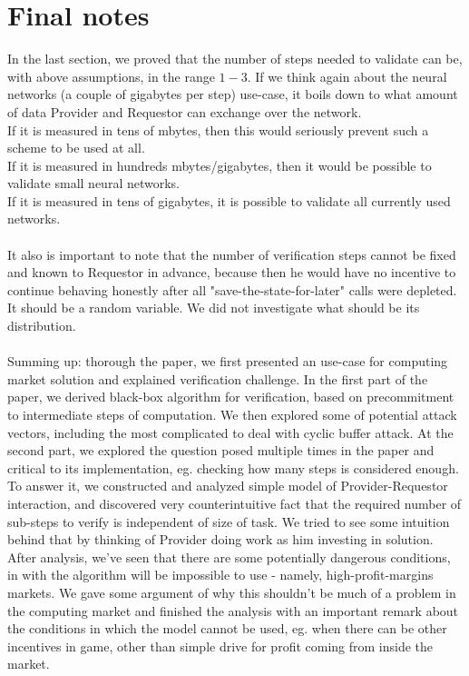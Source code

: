 \documentclass{winnower}
\begin{document}
\section{Final notes}
In the last section, we proved that the number of steps needed to validate can be, with above assumptions, in the range $1-3$. If we think again about the neural networks (a couple of gigabytes per step) use-case, it boils down to what amount of data Provider and Requestor can exchange over the network.\\
If it is measured in tens of mbytes, then this would seriously prevent such a scheme to be used at all.\\
If it is measured in hundreds mbytes/gigabytes, then it would be possible to validate small neural networks.\\
If it is measured in tens of gigabytes, it is possible to validate all currently used networks.\\
\\
It also is important to note that the number of verification steps cannot be fixed and known to Requestor in advance, because then he would have no incentive to continue behaving honestly after all "save-the-state-for-later" calls were depleted. It should be a random variable. We did not investigate what should be its distribution.\\
\\
Summing up: thorough the paper, we first presented an use-case for computing market solution and explained verification challenge. 
In the first part of the paper, we derived black-box algorithm for verification, based on precommitment to intermediate steps of computation. We then explored some of potential attack vectors, including the most complicated to deal with cyclic buffer attack. 
At the second part, we explored the question posed multiple times in the paper and critical to its implementation, eg. checking how many steps is considered enough. To answer it, we constructed and analyzed simple model of Provider-Requestor interaction, and discovered very counterintuitive fact that the required number of sub-steps to verify is independent of size of task. We tried to see some intuition behind that by thinking of Provider doing work as him investing in solution.
After analysis, we've seen that there are some potentially dangerous conditions, in with the algorithm will be impossible to use - namely, high-profit-margins markets. We gave some argument of why this shouldn't be much of a problem in the computing market and finished the analysis with an important remark about the conditions in which the model cannot be used, eg. when there can be other incentives in game, other than simple drive for profit coming from inside the market.
\end{document}
